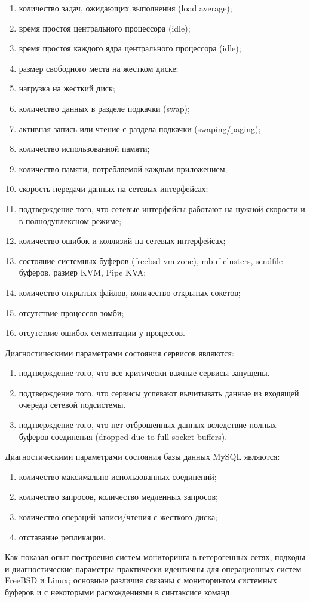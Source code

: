 \documentclass[10pt, a5paper]{article}
\begin{document}
\begin{enumerate}
	\item количество задач, ожидающих выполнения (load average);
	\item время простоя центрального процессора (idle);
	\item время простоя каждого ядра центрального процессора (idle);
	\item размер свободного места на жестком диске;
	\item нагрузка на жесткий диск;
	\item количество данных в разделе подкачки (swap);
	\item активная запись или чтение с раздела подкачки (swaping/paging);
	\item количество использованной памяти;
	\item количество памяти, потребляемой каждым приложением;
	\item скорость передачи данных на сетевых интерфейсах;
	\item подтверждение того, что сетевые интерфейсы работают на нужной скорости и в полнодуплексном режиме;
	\item количество ошибок и коллизий на сетевых интерфейсах;
	\item состояние системных буферов (freebsd vm.zone), mbuf clusters, sendfile-буферов, размер KVM, Pipe KVA;
	\item количество открытых файлов, количество открытых сокетов;
	\item отсутствие процессов-зомби;
	\item отсутствие ошибок сегментации у процессов.
\end{enumerate}
Диагностическими параметрами состояния сервисов являются:
\begin{enumerate}
	\item подтверждение того, что все критически важные сервисы запущены.
	\item подтверждение того, что сервисы успевают вычитывать данные из входящей очереди сетевой подсистемы.
	\item подтверждение того, что нет отброшенных данных вследствие полных буферов соединения (dropped due to full socket buffers).
\end{enumerate}
Диагностическими параметрами состояния базы данных MySQL являются:
\begin{enumerate}
	\item количество максимально использованных соединений;
	\item количество запросов, количество медленных запросов;
	\item количество операций записи/чтения с жесткого диска;
	\item отставание репликации.
\end{enumerate}
Как показал опыт построения систем мониторинга в гетерогенных сетях, подходы и диагностические параметры практически идентичны для операционных систем FreeBSD и Linux; основные различия связаны с мониторингом системных буферов и с некоторыми расхождениями в синтаксисе команд.
\end{document}
